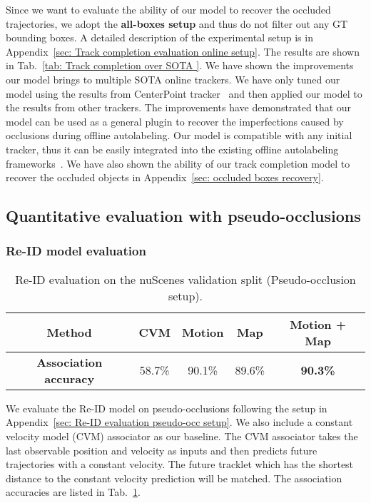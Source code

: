 \documentclass{article} \usepackage{iclr2023_conference,times}
\begin{document}
Since we want to evaluate the ability of our model to recover the occluded trajectories, we adopt the \textbf{all-boxes setup} and thus do not filter out any GT bounding boxes. A detailed description of the experimental setup is in Appendix~\ref{sec: Track completion evaluation online setup}. The results are shown in Tab.~\ref{tab: Track completion over SOTA }. We have shown the improvements our model brings to multiple SOTA online trackers. We have only tuned our model using the results from CenterPoint tracker~\cite{Centerpoint} and then applied our model to the results from other trackers. The improvements have demonstrated that our model can be used as a general plugin to recover the imperfections caused by occlusions during offline autolabeling. Our model is compatible with any initial tracker, thus it can be easily integrated into the existing offline autolabeling frameworks~\cite{offboard_labeling,Auto4d}. We have also shown the ability of our track completion model to recover the occluded objects in Appendix~\ref{sec: occluded boxes recovery}. 


\vspace{-1mm}
\subsection{Quantitative evaluation with pseudo-occlusions}
\label{sec: pseudo-occlusion eval}
\vspace{-1mm}
\subsubsection{Re-ID model evaluation}
\vspace{-1mm}

\begin{table}
    \centering
    \begin{tabular}{c|c c c c }
     \textbf{Method}  & CVM & Motion & Map & Motion + Map \\
    \hline \textbf{Association accuracy } & 58.7\% & 90.1\% & 89.6\% & \textbf{90.3\%} \\
    \end{tabular}
    \caption{Re-ID evaluation on the nuScenes validation split (Pseudo-occlusion setup). 
    }
    \label{tab: pseudo occlusion Re-ID}
\end{table}
We evaluate the Re-ID model on pseudo-occlusions following the setup in Appendix~\ref{sec: Re-ID evaluation pseudo-occ setup}.  We also include a constant velocity model (CVM) associator as our baseline. The CVM associator takes the last observable position and velocity as inputs and then predicts future trajectories with a constant velocity. The future tracklet which has the shortest distance to the constant velocity prediction will be matched. The association accuracies are listed in Tab.~\ref{tab: pseudo occlusion Re-ID}. 
\end{document}
